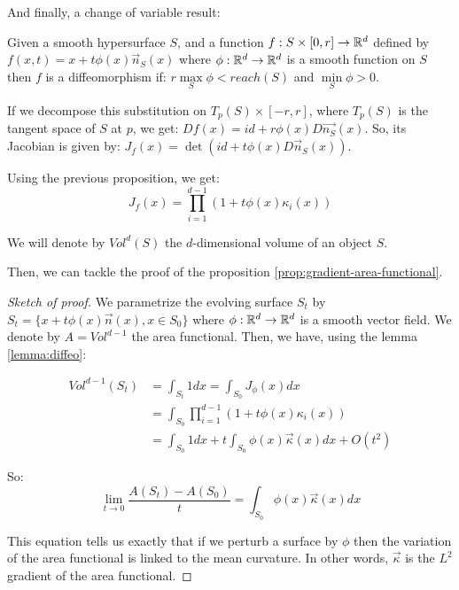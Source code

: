 And finally, a change of variable result:

\begin{lemma}
    \label{lemma:diffeo}
    Given a smooth hypersurface $ S $, and a function $ f : S \times [0, r] \to \mathbb{R}^d $
    defined by $ f(x, t) = x + t \phi(x) \vec{n}_S(x) $ where $ \phi : \mathbb{R}^d \to
    \mathbb{R}^d $ is a smooth function on $ S $ then $ f $ is a diffeomorphism if: $ r
    \max\limits_S \phi < reach(S) $ and $ \min\limits_S \phi > 0 $.

    If we decompose this substitution on $ T_p(S) \times [-r, r] $, where $ T_p(S)
    $ is the tangent space of $ S $ at $ p $, we get: $ Df(x) = id + r \phi(x) D
    \vec{n_S}(x) $.  So, its Jacobian is given by: $ J_f(x) = \det(id + t \phi(x) D
    \vec{n}_S (x)) $.

    Using the previous proposition, we get:
    $$ J_f(x) = \prod_{i=1}^{d-1} (1 + t \phi(x) \kappa_i(x)) $$
\end{lemma}

We will denote by $ Vol^d(S) $ the $d$-dimensional volume of an object $ S
$.

Then, we can tackle the proof of the proposition
\ref{prop:gradient-area-functional}.

\begin{proof}[Sketch of proof]
    We parametrize the evolving surface $ S_t $ by $ S_t = \{ x + t \phi(x)
    \vec{n}(x), x \in S_0\} $ where $ \phi : \mathbb{R}^d \rightarrow \mathbb{R}^d $ is a smooth
    vector field. We denote by $ A = Vol^{d-1} $ the area functional.
    Then, we have, using the lemma \ref{lemma:diffeo}:

    \begin{align*}
        Vol^{d-1}(S_t) &= \int_{S_t} 1 dx = \int_{S_0} J_{\phi}(x) dx \\
        &= \int_{S_0} \prod_{i=1}^{d-1} (1 + t \phi(x) \kappa_i(x)) \\
        &= \int_{S_0} 1dx + t \int_{S_0} \phi(x) \vec{\kappa}(x) dx + O(t^2)
    \end{align*}

    So:
    $$ \lim\limits_{t \to 0} \frac{A(S_t) - A(S_0)}{t}= \int_{S_0}
    \phi(x) \vec{\kappa}(x) dx $$

    This equation tells us exactly that if we perturb a surface by $ \phi $
    then the variation of the area functional is linked to the mean curvature.
    In other words, $ \vec{\kappa} $ is the $ L^2 $ gradient of the area
    functional.
\end{proof}

